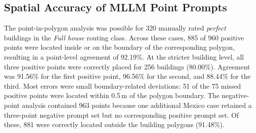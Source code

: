 \subsection{Spatial Accuracy of MLLM Point Prompts}
\label{sec:results_mllm_point_prompts}

The point-in-polygon analysis was possible for 320 manually rated \textit{perfect} buildings in the \textit{Full house} routing class. Across these cases, 885 of 960 positive points were located inside or on the boundary of the corresponding polygon, resulting in a point-level agreement of 92.19\%. At the stricter building level, all three positive points were correctly placed for 256 buildings (80.00\%). Agreement was 91.56\% for the first positive point, 96.56\% for the second, and 88.44\% for the third. Most errors were small boundary-related deviations: 51 of the 75 missed positive points were located within 0.5\,m of the polygon boundary. The negative-point analysis contained 963 points because one additional Mexico case retained a three-point negative prompt set but no corresponding positive prompt set. Of these, 881 were correctly located outside the building polygons (91.48\%).

